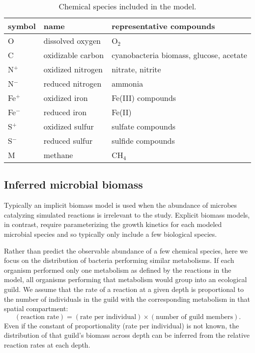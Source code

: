 \documentclass{report}
\begin{document}
\begin{table}
\centering
\begin{tabular}{ l l l }
\toprule
symbol & name  & representative compounds \\
\midrule
O   & dissolved oxygen    & O$_2$ \\
C   & oxidizable carbon & cyanobacteria biomass, glucose, acetate \\
N$^+$ & oxidized nitrogen &  nitrate, nitrite \\
N$^-$ & reduced nitrogen  & ammonia \\
Fe$^+$ &  oxidized iron  & Fe(III) compounds  \\
Fe$^-$ &  reduced iron  & Fe(II)  \\
S$^+$ &  oxidized sulfur  & sulfate compounds \\
S$^-$ &  reduced sulfur  & sulfide compounds  \\
M   &   methane &   CH$_4$ \\
\bottomrule
\end{tabular}
\caption{Chemical species included in the model.}
\label{tab:chemical_species}
\end{table}

\subsection{Inferred microbial biomass}
Typically an implicit biomass model is used when the abundance of microbes catalyzing
simulated reactions is irrelevant to the study. Explicit biomass models, in contrast, require parameterizing the growth kinetics for each modeled microbial species and so typically only include a few biological species. 

Rather than predict the observable abundance of a few chemical species, here we focus on the
distribution of bacteria performing similar metabolisms. If each organism performed only
one metabolism as defined by the reactions in the model, all organisms performing that
metabolism would group into an ecological guild. We assume that the
rate of a reaction at a given depth is proportional to the number of individuals in the guild with the
corresponding metabolism in that spatial compartment:
\begin{equation}
  (\text{reaction rate}) = (\text{rate per individual}) \times (\text{number of guild members}).
\end{equation}
Even if the constant of proportionality (rate per individual) is not known, the distribution of
that guild's biomass across
depth can be inferred from the relative reaction rates at each depth.
\end{document}
